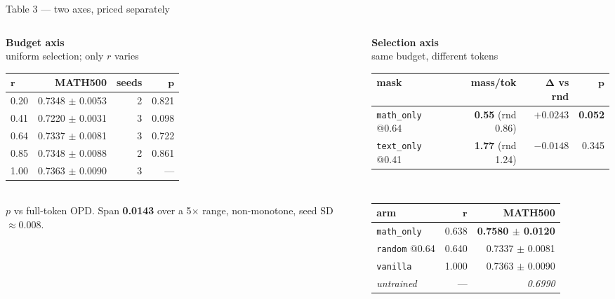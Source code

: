 \documentclass[aspectratio=169,11pt]{beamer}
\newcommand{\up}[1]{\textcolor{good}{\textbf{#1}}}
\newcommand{\dn}[1]{\textcolor{bad}{\textbf{#1}}}
\newcommand{\aside}[1]{{\footnotesize\textcolor{mut}{#1}}}
\begin{document}
\begin{frame}{Table 3 --- two axes, priced separately}
\vspace{0.4em}
\begin{columns}[T]
\begin{column}{0.47\textwidth}
\centering\textbf{\small Budget axis} \\[0.2em]
\aside{uniform selection; only $r$ varies}\\[0.4em]
{\footnotesize
\begin{tabular}{@{}lrrr@{}}
\toprule
$\boldsymbol{r}$ & \textbf{MATH500} & \textbf{seeds} & $\boldsymbol{p}$ \\
\midrule
0.20 & 0.7348 $\pm$ 0.0053 & 2 & 0.821 \\
0.41 & 0.7220 $\pm$ 0.0031 & 3 & 0.098 \\
0.64 & 0.7337 $\pm$ 0.0081 & 3 & 0.722 \\
0.85 & 0.7348 $\pm$ 0.0088 & 2 & 0.861 \\
1.00 & 0.7363 $\pm$ 0.0090 & 3 & --- \\
\bottomrule
\end{tabular}}
\\[0.4em]
\aside{$p$ vs full-token OPD. Span \textbf{0.0143} over a 5$\times$ range, non-monotone,
seed SD $\approx0.008$.}
\end{column}
\begin{column}{0.53\textwidth}
\centering\textbf{\small Selection axis} \\[0.2em]
\aside{same budget, different tokens}\\[0.4em]
{\footnotesize
\begin{tabular}{@{}lrrr@{}}
\toprule
\textbf{mask} & \textbf{mass/tok} & $\boldsymbol{\Delta}$\textbf{ vs rnd} & $\boldsymbol{p}$ \\
\midrule
\texttt{math\_only} @0.64 & \dn{0.55} \aside{(rnd 0.86)} & \up{$+0.0243$} & \up{0.052} \\
\texttt{text\_only} @0.41 & \up{1.77} \aside{(rnd 1.24)} & $-0.0148$ & 0.345 \\
\bottomrule
\end{tabular}}
\\[0.6em]
{\footnotesize
\begin{tabular}{@{}lrr@{}}
\toprule
\textbf{arm} & $\boldsymbol{r}$ & \textbf{MATH500} \\
\midrule
\texttt{math\_only}      & 0.638 & \up{0.7580 $\pm$ 0.0120} \\
\texttt{random} @0.64    & 0.640 & 0.7337 $\pm$ 0.0081 \\
\texttt{vanilla}         & 1.000 & 0.7363 $\pm$ 0.0090 \\
\emph{untrained}         & ---   & \emph{0.6990} \\
\bottomrule
\end{tabular}}
\end{column}
\end{columns}


\end{frame}
\end{document}
